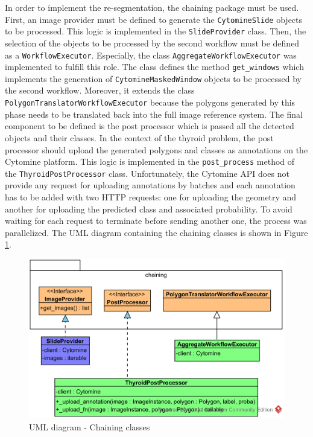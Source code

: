 In order to implement the re-segmentation, the chaining package must be used. First, an image provider must be defined to generate the \texttt{CytomineSlide} objects to be processed. This logic is implemented in the \texttt{SlideProvider} class. Then, the selection of the objects to be processed by the second workflow must be defined as a \texttt{WorkflowExecutor}. Especially, the class \texttt{AggregateWorkflowExecutor} was implemented to fulfill this role. The class defines the method \texttt{get\_windows} which implements the generation of \texttt{CytomineMaskedWindow} objects to be processed by the second workflow. Moreover, it extends the class \texttt{PolygonTranslatorWorkflowExecutor} because the polygons generated by this phase needs to be translated back into the full image reference system. The final component to be defined is the post processor which is passed all the detected objects and their classes. In the context of the thyroid problem, the post processor should upload the generated polygons and classes as annotations on the Cytomine platform. This logic is implemented in the \texttt{post\_process} method of the \texttt{ThyroidPostProcessor} class. Unfortunately, the Cytomine API does not provide any request for uploading annotations by batches and each annotation has to be added with two HTTP requests: one for uploading the geometry and another for uploading the predicted class and associated probability. To avoid waiting for each request to terminate before sending another one, the process was parallelized. The UML diagram containing the chaining classes is shown in Figure \ref{fig:uml_cyto_chaining}.


\begin{figure}
	\center
	\includegraphics[scale=0.85]{image/thyroid_image_provider.png}
	\caption{UML diagram - Chaining classes}
	\label{fig:uml_cyto_chaining}
\end{figure}



